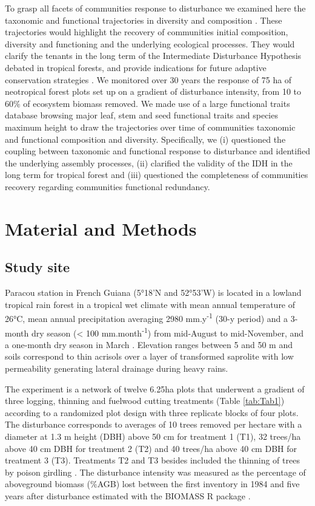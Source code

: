 \documentclass[fleqn,10pt]{ArtEcoFoG} %
\theoremstyle{definition}
\theoremstyle{definition}
\theoremstyle{definition}
\theoremstyle{remark}
\begin{document}
To grasp all facets of communities response to disturbance we examined
here the taxonomic and functional trajectories in diversity and
composition \citep{Lohbeck2015, Guariguata2001}. These trajectories
would highlight the recovery of communities initial composition,
diversity and functioning and the underlying ecological processes. They
would clarify the tenants in the long term of the Intermediate
Disturbance Hypothesis debated in tropical forests, and provide
indications for future adaptive conservation strategies
\citep{Adler2007}. We monitored over 30 years the response of 75 ha of
neotropical forest plots set up on a gradient of disturbance intensity,
from 10 to 60\% of ecosystem biomass removed. We made use of a large
functional traits database browsing major leaf, stem and seed functional
traits and species maximum height to draw the trajectories over time of
communities taxonomic and functional composition and diversity.
Specifically, we (i) questioned the coupling between taxonomic and
functional response to disturbance and identified the underlying
assembly processes, (ii) clarified the validity of the IDH in the long
term for tropical forest and (iii) questioned the completeness of
communities recovery regarding communities functional redundancy.

\section{Material and Methods}\label{material-and-methods}

\subsection{Study site}\label{study-site}

Paracou station in French Guiana (5°18'N and 52°53'W) is located in a
lowland tropical rain forest in a tropical wet climate with mean annual
temperature of 26°C, mean annual precipitation averaging 2980
mm.y\textsuperscript{-1} (30-y period) and a 3-month dry season
(\textless{} 100 mm.month\textsuperscript{-1}) from mid-August to
mid-November, and a one-month dry season in March \citep{Wagner2011}.
Elevation ranges between 5 and 50 m and soils correspond to thin
acrisols over a layer of transformed saprolite with low permeability
generating lateral drainage during heavy rains.

The experiment is a network of twelve 6.25ha plots that underwent a
gradient of three logging, thinning and fuelwood cutting treatments
(Table \ref{tab:Tab1}) according to a randomized plot design
with three replicate blocks of four plots. The disturbance corresponds
to averages of 10 trees removed per hectare with a diameter at 1.3 m
height (DBH) above 50 cm for treatment 1 (T1), 32 trees/ha above 40 cm
DBH for treatment 2 (T2) and 40 trees/ha above 40 cm DBH for treatment 3
(T3). Treatments T2 and T3 besides included the thinning of trees by
poison girdling \citep{Schmitt1990, Blanc2009}. The disturbance
intensity was measured as the percentage of aboveground biomass (\%AGB)
lost between the first inventory in 1984 and five years after
disturbance \citep{Piponiot2016} estimated with the BIOMASS R package
\citep{Biomass2018}.
\end{document}
